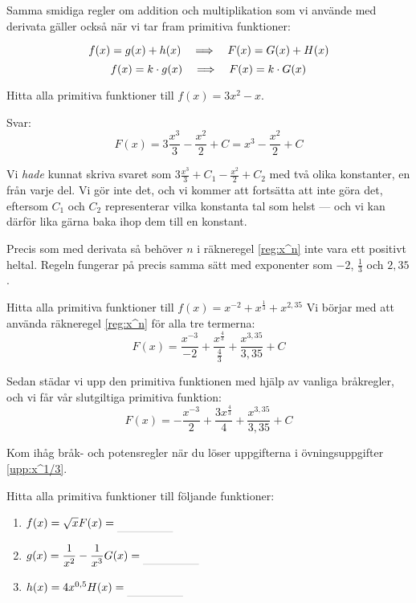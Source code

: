 \documentclass[a4paper, 12pt]{article}
\begin{document}
Samma smidiga regler om addition och multiplikation som vi använde med derivata gäller också när vi tar fram primitiva funktioner:
\begin{regel}
    \[f(x) = g(x) + h(x) \hspace{1em} \Longrightarrow \hspace{1em} F(x) = G(x) + H(x)\]
    \[f(x) = k\cdot g(x) \hspace{1em} \Longrightarrow \hspace{1em} F(x) = k\cdot G(x)\]
\end{regel}


\begin{exempel}
    Hitta alla primitiva funktioner till $f(x) = 3x^2 - x$.

    \dinkus
    Svar: \[F(x) = 3\dfrac {x^3}3 - \dfrac {x^2}2  + C= x^3 - \dfrac {x^2}2 + C\]

    Vi \emph{hade} kunnat skriva svaret som $3\frac {x^3}3 + C_1 - \frac {x^2}2  + C_2$ med två olika konstanter, en från varje del. Vi gör inte det, och vi kommer att fortsätta att inte göra det, eftersom $C_1$ och $C_2$ representerar vilka konstanta tal som helst --- och vi kan därför lika gärna baka ihop dem till en konstant.
\end{exempel}

Precis som med derivata så behöver $n$ i räkneregel \ref{reg:x^n} inte vara ett positivt heltal. Regeln fungerar på precis samma sätt med exponenter som $-2$, $\frac 13$ och $2,35$.


\begin{exempel}
    Hitta alla primitiva funktioner till $f(x) = x^{-2} + x^\frac{1}{3} + x^{2,35}$
    \dinkus
    Vi börjar med att använda räkneregel \ref{reg:x^n} för alla tre termerna:
    \[F(x) = \dfrac {x^{-3}}{-2} + \dfrac {x^\frac{4}{3}}{\frac{4}{3}} + \dfrac {x^{3,35}}{3,35} + C \]
    
    Sedan städar vi upp den primitiva funktionen med hjälp av vanliga bråkregler, och vi får vår slutgiltiga primitiva funktion:
    \[F(x) = - \dfrac {x^{-3}}{2} + \dfrac {3x^\frac{4}{3}}{4} + \dfrac {x^{3,35}}{3,35} + C\]
\end{exempel}

Kom ihåg bråk- och potensregler när du löser uppgifterna i övningsuppgifter \ref{upp:x^1/3}.

\begin{uppgifter}
    \label{upp:x^1/3}
    Hitta alla primitiva funktioner till följande funktioner: 
    \begin{multicols}{3}
        \begin{enumerate}
            \item $f(x) = \sqrt{x} \\ F(x) \ans$
            \item $g(x) = \dfrac 1{x^2} - \dfrac 1{x^{3}} \\ G(x) \ans$
            \item $h(x) = 4x^{0,5} \\ H(x) \ans$
        \end{enumerate}
    \end{multicols}
\end{uppgifter}
\end{document}
